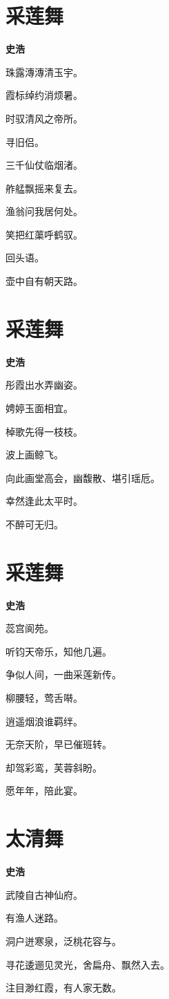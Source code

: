 \documentclass[12pt,a4paper]{ctexbook}
\begin{document}
\section{采莲舞}
\textbf{史浩}\par\vspace{0.5em}
珠露漙漙清玉宇。\par
霞标绰约消烦暑。\par
时驭清风之帝所。\par
寻旧侣。\par
三千仙仗临烟渚。\par
舴艋飘摇来复去。\par
渔翁问我居何处。\par
笑把红蕖呼鹤驭。\par
回头语。\par
壶中自有朝天路。\par

\section{采莲舞}
\textbf{史浩}\par\vspace{0.5em}
彤霞出水弄幽姿。\par
娉婷玉面相宜。\par
棹歌先得一枝枝。\par
波上画鲸飞。\par
向此画堂高会，幽馥散、堪引瑶卮。\par
幸然逢此太平时。\par
不醉可无归。\par

\section{采莲舞}
\textbf{史浩}\par\vspace{0.5em}
蕊宫阆苑。\par
听钧天帝乐，知他几遍。\par
争似人间，一曲采莲新传。\par
柳腰轻，莺舌啭。\par
逍遥烟浪谁羁绊。\par
无奈天阶，早已催班转。\par
却驾彩鸾，芙蓉斜盼。\par
愿年年，陪此宴。\par

\section{太清舞}
\textbf{史浩}\par\vspace{0.5em}
武陵自古神仙府。\par
有渔人迷路。\par
洞户迸寒泉，泛桃花容与。\par
寻花逶逦见灵光，舍扁舟、飘然入去。\par
注目渺红霞，有人家无数。\par
\end{document}
